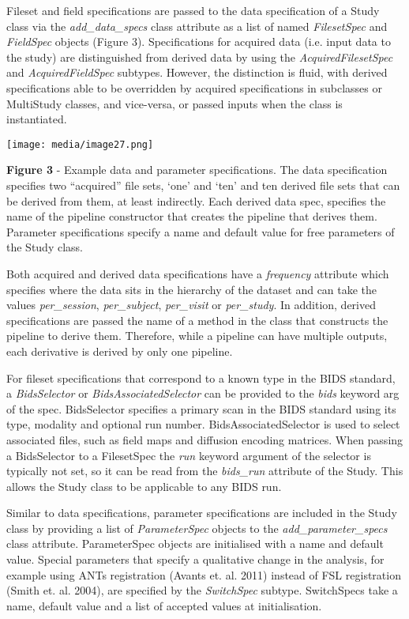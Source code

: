 Fileset and field specifications are passed to the data specification of
a Study class via the \emph{add\_data\_specs} class attribute as a list
of named \emph{FilesetSpec} and \emph{FieldSpec} objects (Figure 3).
Specifications for acquired data (i.e. input data to the study) are
distinguished from derived data by using the \emph{AcquiredFilesetSpec}
and \emph{AcquiredFieldSpec} subtypes. However, the distinction is
fluid, with derived specifications able to be overridden by acquired
specifications in subclasses or MultiStudy classes, and vice-versa, or
passed inputs when the class is instantiated.

\texttt{[image: media/image27.png]}

\textbf{Figure 3} - Example data and parameter specifications. The data
specification specifies two ``acquired'' file sets, `one' and `ten' and
ten derived file sets that can be derived from them, at least
indirectly. Each derived data spec, specifies the name of the pipeline
constructor that creates the pipeline that derives them. Parameter
specifications specify a name and default value for free parameters of
the Study class.

Both acquired and derived data specifications have a \emph{frequency}
attribute which specifies where the data sits in the hierarchy of the
dataset and can take the values \emph{per\_session},
\emph{per\_subject}, \emph{per\_visit} or \emph{per\_study}. In
addition, derived specifications are passed the name of a method in the
class that constructs the pipeline to derive them. Therefore, while a
pipeline can have multiple outputs, each derivative is derived by only
one pipeline.

For fileset specifications that correspond to a known type in the BIDS
standard, a \emph{BidsSelector} or \emph{BidsAssociatedSelector} can be
provided to the \emph{bids} keyword arg of the spec. BidsSelector
specifies a primary scan in the BIDS standard using its type, modality
and optional run number. BidsAssociatedSelector is used to select
associated files, such as field maps and diffusion encoding matrices.
When passing a BidsSelector to a FilesetSpec the \emph{run} keyword
argument of the selector is typically not set, so it can be read from
the \emph{bids\_run} attribute of the Study. This allows the Study class
to be applicable to any BIDS run.

Similar to data specifications, parameter specifications are included in
the Study class by providing a list of \emph{ParameterSpec} objects to
the \emph{add\_parameter\_specs} class attribute. ParameterSpec objects
are initialised with a name and default value. Special parameters that
specify a qualitative change in the analysis, for example using ANTs
registration (Avants et. al. 2011) instead of FSL registration (Smith
et. al. 2004), are specified by the \emph{SwitchSpec} subtype.
SwitchSpecs take a name, default value and a list of accepted values at
initialisation.

